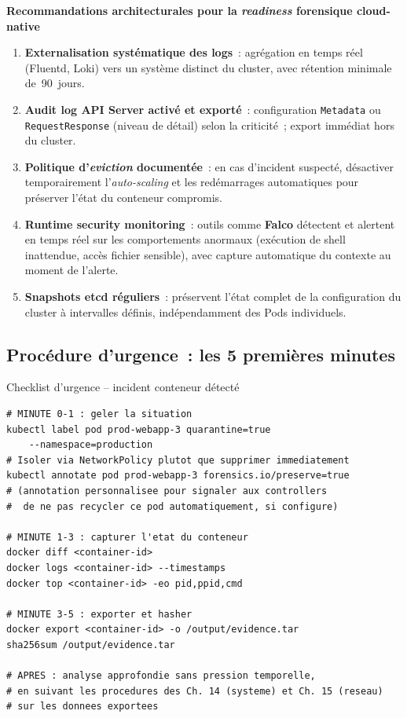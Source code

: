 \begin{boxPNC}
\textbf{Recommandations architecturales pour la \textit{readiness}
forensique cloud-native}

\begin{enumerate}
    \item \textbf{Externalisation systématique des logs}~: agrégation
          en temps réel (Fluentd, Loki) vers un système distinct
          du cluster, avec rétention minimale de~90~jours.
    \item \textbf{Audit log API Server activé et exporté}~:
          configuration \texttt{Metadata} ou \texttt{RequestResponse}
          (niveau de détail) selon la criticité~; export immédiat
          hors du cluster.
    \item \textbf{Politique d'\textit{eviction} documentée}~: en cas
          d'incident suspecté, désactiver temporairement
          l'\textit{auto-scaling} et les redémarrages automatiques
          pour préserver l'état du conteneur compromis.
    \item \textbf{Runtime security monitoring}~: outils comme
          \textbf{Falco} détectent et alertent en temps réel sur
          les comportements anormaux (exécution de shell inattendue,
          accès fichier sensible), avec capture automatique du
          contexte au moment de l'alerte.
    \item \textbf{Snapshots etcd réguliers}~: préservent l'état
          complet de la configuration du cluster à intervalles
          définis, indépendamment des Pods individuels.
\end{enumerate}
\end{boxPNC}

\subsection{Procédure d'urgence~: les 5 premières minutes}

\begin{boxoutils}{Checklist d'urgence -- incident conteneur détecté}
\begin{lstlisting}[language=bash_forensique]
# MINUTE 0-1 : geler la situation
kubectl label pod prod-webapp-3 quarantine=true
    --namespace=production
# Isoler via NetworkPolicy plutot que supprimer immediatement
kubectl annotate pod prod-webapp-3 forensics.io/preserve=true
# (annotation personnalisee pour signaler aux controllers
#  de ne pas recycler ce pod automatiquement, si configure)

# MINUTE 1-3 : capturer l'etat du conteneur
docker diff <container-id>
docker logs <container-id> --timestamps
docker top <container-id> -eo pid,ppid,cmd

# MINUTE 3-5 : exporter et hasher
docker export <container-id> -o /output/evidence.tar
sha256sum /output/evidence.tar

# APRES : analyse approfondie sans pression temporelle,
# en suivant les procedures des Ch. 14 (systeme) et Ch. 15 (reseau)
# sur les donnees exportees
\end{lstlisting}
\end{boxoutils}

